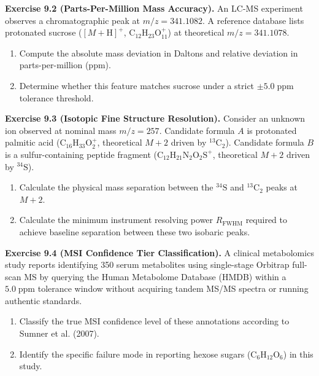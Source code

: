 \documentclass[11pt,twoside,openright]{book}
\begin{document}
\vspace{0.8em}
\noindent\textbf{Exercise 9.2 (Parts-Per-Million Mass Accuracy).}\enspace
An LC-MS experiment observes a chromatographic peak at $m/z = 341.1082$. A reference database lists protonated sucrose ($[M+\text{H}]^+$, $\text{C}_{12}\text{H}_{23}\text{O}_{11}^+$) at theoretical $m/z = 341.1078$.
\begin{enumerate}
    \item Compute the absolute mass deviation in Daltons and relative deviation in parts-per-million (ppm).
    \item Determine whether this feature matches sucrose under a strict $\pm 5.0\;\text{ppm}$ tolerance threshold.
\end{enumerate}

\vspace{0.8em}
\noindent\textbf{Exercise 9.3 (Isotopic Fine Structure Resolution).}\enspace
Consider an unknown ion observed at nominal mass $m/z = 257$. Candidate formula $A$ is protonated palmitic acid ($\text{C}_{16}\text{H}_{33}\text{O}_2^+$, theoretical $M+2$ driven by $^{13}\text{C}_2$). Candidate formula $B$ is a sulfur-containing peptide fragment ($\text{C}_{12}\text{H}_{21}\text{N}_2\text{O}_2\text{S}^+$, theoretical $M+2$ driven by $^{34}\text{S}$).
\begin{enumerate}
    \item Calculate the physical mass separation between the $^{34}\text{S}$ and $^{13}\text{C}_2$ peaks at $M+2$.
    \item Calculate the minimum instrument resolving power $R_{\text{FWHM}}$ required to achieve baseline separation between these two isobaric peaks.
\end{enumerate}

\vspace{0.8em}
\noindent\textbf{Exercise 9.4 (MSI Confidence Tier Classification).}\enspace
A clinical metabolomics study reports identifying 350 serum metabolites using single-stage Orbitrap full-scan MS by querying the Human Metabolome Database (HMDB) within a $5.0\;\text{ppm}$ tolerance window without acquiring tandem MS/MS spectra or running authentic standards.
\begin{enumerate}
    \item Classify the true MSI confidence level of these annotations according to Sumner et al. (2007).
    \item Identify the specific failure mode in reporting hexose sugars ($\text{C}_6\text{H}_{12}\text{O}_6$) in this study.
\end{enumerate}
\end{document}
